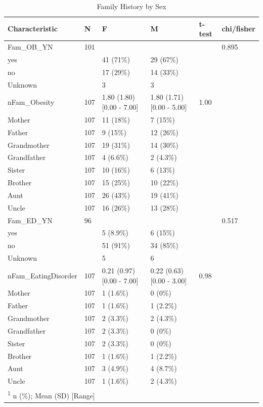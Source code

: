 \documentclass[
]{article}
\begin{document}
\begin{table}[!h]

\caption{\label{tab:Fam_sex_tab}Family History by Sex}
\centering
\begin{tabular}[t]{llllll}
\toprule
Characteristic & N & F & M & t-test & chi/fisher\\
\midrule
Fam\_OB\_YN & 101 &  &  &  & 0.895\\
\hspace{1em}yes &  & 41 (71\%) & 29 (67\%) &  & \\
\hspace{1em}no &  & 17 (29\%) & 14 (33\%) &  & \\
\hspace{1em}Unknown &  & 3 & 3 &  & \\
nFam\_Obesity & 107 & 1.80 (1.80)   [0.00 - 7.00] & 1.80 (1.71)   [0.00 - 5.00] & 1.00 & \\
\addlinespace
Mother & 107 & 11 (18\%) & 7 (15\%) &  & \\
Father & 107 & 9 (15\%) & 12 (26\%) &  & \\
Grandmother & 107 & 19 (31\%) & 14 (30\%) &  & \\
Grandfather & 107 & 4 (6.6\%) & 2 (4.3\%) &  & \\
Sister & 107 & 10 (16\%) & 6 (13\%) &  & \\
\addlinespace
Brother & 107 & 15 (25\%) & 10 (22\%) &  & \\
Aunt & 107 & 26 (43\%) & 19 (41\%) &  & \\
Uncle & 107 & 16 (26\%) & 13 (28\%) &  & \\
Fam\_ED\_YN & 96 &  &  &  & 0.517\\
\hspace{1em}yes &  & 5 (8.9\%) & 6 (15\%) &  & \\
\addlinespace
\hspace{1em}no &  & 51 (91\%) & 34 (85\%) &  & \\
\hspace{1em}Unknown &  & 5 & 6 &  & \\
nFam\_EatingDisorder & 107 & 0.21 (0.97)   [0.00 - 7.00] & 0.22 (0.63)   [0.00 - 3.00] & 0.98 & \\
Mother & 107 & 1 (1.6\%) & 0 (0\%) &  & \\
Father & 107 & 1 (1.6\%) & 1 (2.2\%) &  & \\
\addlinespace
Grandmother & 107 & 2 (3.3\%) & 2 (4.3\%) &  & \\
Grandfather & 107 & 2 (3.3\%) & 0 (0\%) &  & \\
Sister & 107 & 2 (3.3\%) & 0 (0\%) &  & \\
Brother & 107 & 1 (1.6\%) & 1 (2.2\%) &  & \\
Aunt & 107 & 3 (4.9\%) & 4 (8.7\%) &  & \\
\addlinespace
Uncle & 107 & 1 (1.6\%) & 2 (4.3\%) &  & \\
\bottomrule
\multicolumn{6}{l}{\rule{0pt}{1em}\textsuperscript{1} n (\%); Mean (SD)   [Range]}\\
\end{tabular}
\end{table}
\end{document}
